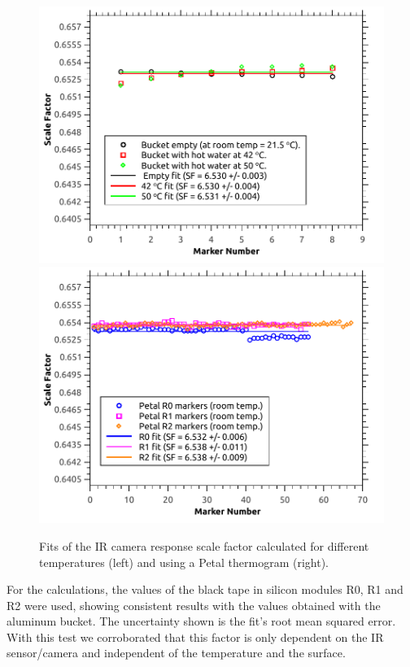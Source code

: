 		\begin{figure}[ht!]
			\centering
			\captionsetup{justification=centering,margin=2cm}
			\includegraphics[scale=0.5]{Figures/Chapter04/BucketScaleFactors.pdf}
			\includegraphics[scale=0.5]{Figures/Chapter04/PetalScaleFactors.pdf}
			\caption{Fits of the IR camera response scale factor calculated for different temperatures (left) and using a Petal thermogram (right).}\label{fig4.7}
		\end{figure}
		
		For the calculations, the values of the black tape in silicon modules R0, R1 and R2 were used, showing consistent results with the values obtained with the aluminum bucket. The uncertainty shown is the fit's root mean squared error. With this test we corroborated that this factor is only dependent on the IR sensor/camera and independent of the temperature and the surface.
	
